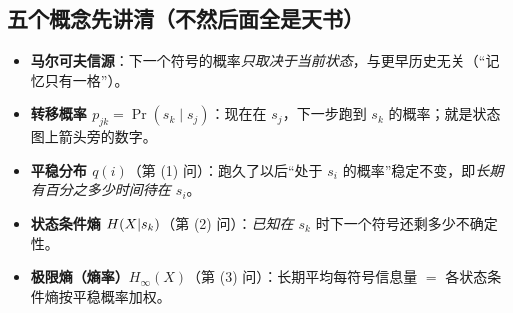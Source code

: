 \documentclass[11pt,a4paper]{ctexart}
\begin{document}
\subsection{五个概念先讲清（不然后面全是天书）}
\begin{itemize}[leftmargin=1.3em,itemsep=1pt,topsep=1pt]
  \item \textbf{马尔可夫信源}：下一个符号的概率\emph{只取决于当前状态}，与更早历史无关（“记忆只有一格”）。
  \item \textbf{转移概率 $p_{jk}=\Pr(s_k\mid s_j)$}：现在在 $s_j$，下一步跑到 $s_k$ 的概率；就是状态图上箭头旁的数字。
  \item \textbf{平稳分布 $q(i)$}（第 (1) 问）：跑久了以后“处于 $s_i$ 的概率”稳定不变，即\emph{长期有百分之多少时间待在 $s_i$}。
  \item \textbf{状态条件熵 $H\!\left(X|s_k\right)$}（第 (2) 问）：\emph{已知在 $s_k$} 时下一个符号还剩多少不确定性。
  \item \textbf{极限熵（熵率）$H_\infty(X)$}（第 (3) 问）：长期平均每符号信息量 $=$ 各状态条件熵按平稳概率加权。
\end{itemize}
\end{document}
